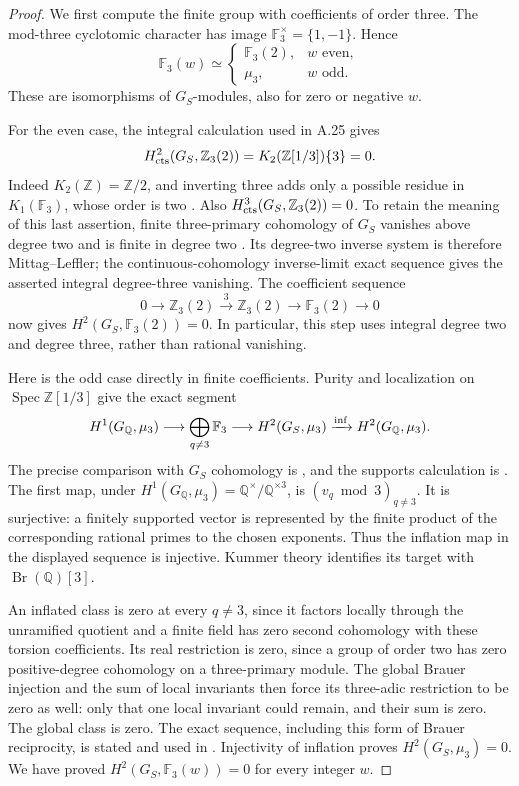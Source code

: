 \begin{proof}
We first compute the finite group with coefficients of order
three. The mod-three cyclotomic character has image
$\mathbb F_3^\times=\{1,-1\}$. Hence
\[
 \mathbb F_3(w)\simeq
 \begin{cases}
   \mathbb F_3(2),&w\text{ even},\\
   \mu_3,&w\text{ odd}.
 \end{cases}
\]
These are isomorphisms of $G_S$-modules, also for zero or negative
$w$.

For the even case, the integral calculation used in A.25 gives
\[
 H^2_{\rm cts}(G_S,\mathbb Z_3(2))
   =K_2(\mathbb Z[1/3])\{3\}=0.
\]
Indeed $K_2(\mathbb Z)=\mathbb Z/2$, and inverting three adds
only a possible residue in
$K_1(\mathbb F_3)$, whose order is two
\cite[III.5.2.2; IV.1.13; V.6.8; VI.8.2]{CohWeibelKbook}.
Also $H^3_{\rm cts}(G_S,\mathbb Z_3(2))=0$.
To retain the meaning of this last assertion, finite three-primary
cohomology of $G_S$ vanishes above degree two and is finite in
degree two \cite[I.4.10(a),(c), pp.56--57]{CohMilneADT}.
Its degree-two inverse system is therefore Mittag--Leffler;
the continuous-cohomology inverse-limit exact sequence gives
the asserted integral degree-three vanishing.
The coefficient sequence
\[
 0\longrightarrow\mathbb Z_3(2)
   \xrightarrow{\ 3\ }\mathbb Z_3(2)
   \longrightarrow\mathbb F_3(2)\longrightarrow0
\]
now gives $H^2(G_S,\mathbb F_3(2))=0$.
In particular, this step uses integral degree two and degree
three, rather than rational vanishing.

Here is the odd case directly in finite coefficients. Purity
and localization on $\operatorname{Spec}\mathbb Z[1/3]$ give
the exact segment
\[
 H^1(G_{\mathbb Q},\mu_3)
 \longrightarrow \bigoplus_{q\ne3}\mathbb F_3
 \longrightarrow H^2(G_S,\mu_3)
 \xrightarrow{\rm inf} H^2(G_{\mathbb Q},\mu_3).
\]
The precise comparison with $G_S$ cohomology is
\cite[II.2.9, pp.170--171]{CohMilneADT}, and the supports
calculation is \cite[II.1.7(b), pp.151--152]{CohMilneADT}.
The first map, under
$H^1(G_{\mathbb Q},\mu_3)=\mathbb Q^\times/\mathbb Q^{\times3}$,
is $(v_q\bmod3)_{q\ne3}$. It is surjective: a finitely
supported vector is represented by the finite product of
the corresponding rational primes to the chosen exponents.
Thus the inflation map in the displayed sequence is injective.
Kummer theory identifies its target with
$\operatorname{Br}(\mathbb Q)[3]$.

An inflated class is zero at every $q\ne3$, since it factors
locally through the unramified quotient and a finite field has
zero second cohomology with these torsion coefficients.
Its real restriction is zero, since a group of order two has
zero positive-degree cohomology on a three-primary module.
The global Brauer injection and the sum of local invariants
then force its three-adic restriction to be zero as well:
only that one local invariant could remain, and their sum is
zero. The global class is zero. The exact sequence, including
this form of Brauer reciprocity, is stated and used in
\cite[II.2.1--2.2, pp.163--165]{CohMilneADT}.
Injectivity of inflation proves
$H^2(G_S,\mu_3)=0$. We have proved
$H^2(G_S,\mathbb F_3(w))=0$ for every integer $w$.


\end{proof}
